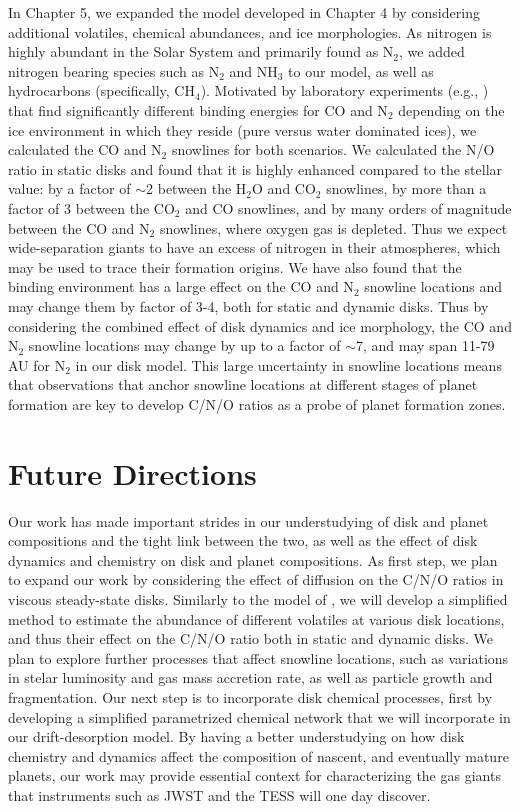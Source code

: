 In Chapter 5, we expanded the model developed in Chapter 4 by considering additional volatiles, chemical abundances, and ice morphologies. As nitrogen is highly abundant in the Solar System and primarily found as N$_2$, we added nitrogen bearing species such as N$_2$ and NH$_3$ to our model, as well as hydrocarbons (specifically, CH$_4$). Motivated by laboratory experiments (e.g., \citealt{fayolle16}) that find significantly different binding energies for CO and N$_2$ depending on the ice environment in which they reside (pure versus water dominated ices), we calculated the CO and N$_2$ snowlines for both scenarios. We calculated the N/O ratio in static disks and found that it is highly enhanced compared to the stellar value: by a factor of $\sim$2 between the H$_2$O and CO$_2$ snowlines, by more than a factor of 3 between the CO$_2$ and CO snowlines, and by many orders of magnitude between the CO and N$_2$ snowlines, where oxygen gas is depleted. Thus we expect wide-separation giants to have an excess of nitrogen in their atmospheres, which may be used to trace their formation origins. We have also found that the binding environment has a large effect on the CO and N$_2$ snowline locations and may change them by factor of 3-4, both for static and dynamic disks. Thus by considering the combined effect of disk dynamics and ice morphology, the CO and N$_2$ snowline locations may change by up to a factor of $\sim$7, and may span 11-79 AU for N$_2$ in our disk model. This large uncertainty in snowline locations means that observations that anchor snowline locations at different stages of planet
formation are key to develop C/N/O ratios as a probe of planet formation zones. 

\section{Future Directions}
\label{sec:future}

Our work has made important strides in our understudying of disk and planet compositions and the tight link between the two, as well as the effect of disk dynamics and chemistry on disk and planet compositions. As first step, we plan to expand our work by considering the effect of diffusion on the C/N/O ratios in viscous steady-state disks. Similarly to the model of \citet{owen14}, we will develop a simplified method to estimate the abundance of different volatiles at various disk locations, and thus their effect on the C/N/O ratio both in static and dynamic disks. We plan to explore further processes that affect snowline locations, such as variations in stelar luminosity and gas mass accretion rate, as well as particle growth and fragmentation. Our next step is to incorporate disk chemical processes, first by developing a simplified parametrized chemical  network that we will incorporate in our  drift-desorption model. By having a better understudying on how disk chemistry and dynamics affect the composition of nascent, and eventually mature planets, our work may provide essential context for characterizing the gas giants
that instruments such as JWST and the TESS will one day discover.  
 
